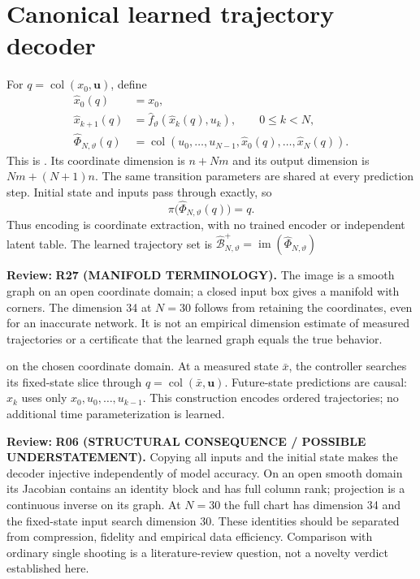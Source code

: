 \documentclass[11pt]{article}
\newcommand{\col}{\operatorname{col}}
\newcommand{\review}[1]{\par\noindent\textcolor{red!70!black}{\textbf{Review:} #1}\par}
\newcommand{\code}[1]{\texttt{\detokenize{#1}}}
\begin{document}
\section{Canonical learned trajectory decoder}
For $q=\col(x_0,\mathbf u)$, define
\begin{align}
\widehat x_0(q)&=x_0,\label{eq:initial}\\
\widehat x_{k+1}(q)&=\widehat f_\vartheta(\widehat x_k(q),u_k),\qquad 0\leq k<N,\label{eq:rollout}\\
\widehat\Phi_{N,\vartheta}(q)&=\col(u_0,\ldots,u_{N-1},\widehat x_0(q),\ldots,\widehat x_N(q)).\label{eq:decoder}
\end{align}
This is \code{CanonicalBehaviorDecoder}. Its coordinate dimension is $n+Nm$ and its output dimension is $Nm+(N+1)n$. The same transition parameters are shared at every prediction step. Initial state and inputs pass through exactly, so
\begin{equation}\label{eq:projection}
\pi\bigl(\widehat\Phi_{N,\vartheta}(q)\bigr)=q.
\end{equation}
Thus encoding is coordinate extraction, with no trained encoder or independent latent table. The learned trajectory set is $\widehat{\mathcal B}_{N,\vartheta}^+=\operatorname{im}(\widehat\Phi_{N,\vartheta})$
\review{\textbf{R27 (MANIFOLD TERMINOLOGY).} The image is a smooth graph on an open coordinate domain; a closed input box gives a manifold with corners. The dimension 34 at $N=30$ follows from retaining the coordinates, even for an inaccurate network. It is not an empirical dimension estimate of measured trajectories or a certificate that the learned graph equals the true behavior.}
 on the chosen coordinate domain. At a measured state $\bar x$, the controller searches its fixed-state slice through $q=\col(\bar x,\mathbf u)$. Future-state predictions are causal: $\widehat x_k$ uses only $x_0,u_0,\ldots,u_{k-1}$. This construction encodes ordered trajectories; no additional time parameterization is learned.
\review{\textbf{R06 (STRUCTURAL CONSEQUENCE / POSSIBLE UNDERSTATEMENT).} Copying all inputs and the initial state makes the decoder injective independently of model accuracy. On an open smooth domain its Jacobian contains an identity block and has full column rank; projection is a continuous inverse on its graph. At $N=30$ the full chart has dimension 34 and the fixed-state input search dimension 30. These identities should be separated from compression, fidelity and empirical data efficiency. Comparison with ordinary single shooting is a literature-review question, not a novelty verdict established here.}
\end{document}
